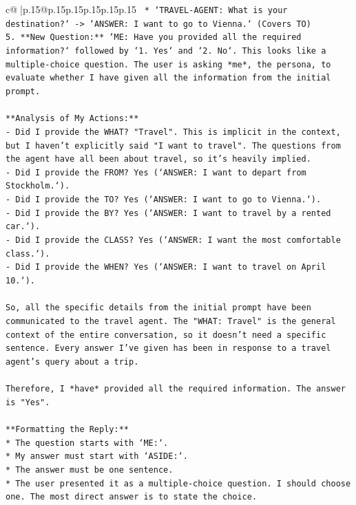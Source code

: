 \documentclass{article}
\begin{document}
{\begin{supertabular}{c@{$\;$}|p{.15\linewidth}@{}p{.15\linewidth}p{.15\linewidth}p{.15\linewidth}p{.15\linewidth}p{.15\linewidth}}
{{{\texttt{    * `TRAVEL{-}AGENT: What is your destination?` {-}> `ANSWER: I want to go to Vienna.` (Covers TO)} \\
\texttt{5. **New Question:** `ME: Have you provided all the required information?` followed by `1. Yes` and `2. No`. This looks like a multiple{-}choice question. The user is asking *me*, the persona, to evaluate whether I have given all the information from the initial prompt.} \\
\\ 
\texttt{**Analysis of My Actions:**} \\
\texttt{{-} Did I provide the WHAT? "Travel". This is implicit in the context, but I haven't explicitly said "I want to travel". The questions from the agent have all been about travel, so it's heavily implied.} \\
\texttt{{-} Did I provide the FROM? Yes (`ANSWER: I want to depart from Stockholm.`).} \\
\texttt{{-} Did I provide the TO? Yes (`ANSWER: I want to go to Vienna.`).} \\
\texttt{{-} Did I provide the BY? Yes (`ANSWER: I want to travel by a rented car.`).} \\
\texttt{{-} Did I provide the CLASS? Yes (`ANSWER: I want the most comfortable class.`).} \\
\texttt{{-} Did I provide the WHEN? Yes (`ANSWER: I want to travel on April 10.`).} \\
\\ 
\texttt{So, all the specific details from the initial prompt have been communicated to the travel agent. The "WHAT: Travel" is the general context of the entire conversation, so it doesn't need a specific sentence. Every answer I've given has been in response to a travel agent's query about a trip.} \\
\\ 
\texttt{Therefore, I *have* provided all the required information. The answer is "Yes".} \\
\\ 
\texttt{**Formatting the Reply:**} \\
\texttt{* The question starts with `ME:`.} \\
\texttt{* My answer must start with `ASIDE:`.} \\
\texttt{* The answer must be one sentence.} \\
\texttt{* The user presented it as a multiple{-}choice question. I should choose one. The most direct answer is to state the choice.} \\
}}}
\end{supertabular}}
\end{document}
